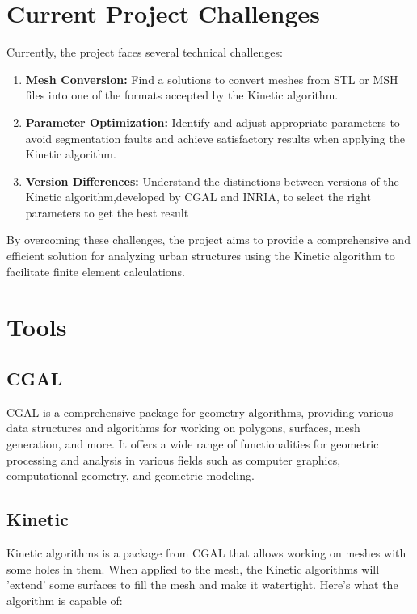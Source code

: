 \documentclass{article}
\begin{document}
\section{Current Project Challenges}

Currently, the project faces several technical challenges:

\begin{enumerate}
    \item \textbf{Mesh Conversion:} Find a solutions to convert meshes 
    from STL or MSH files into one of the formats accepted by the Kinetic algorithm.
    
    \item \textbf{Parameter Optimization:} Identify and adjust appropriate 
    parameters to avoid segmentation faults and achieve satisfactory results 
    when applying the Kinetic algorithm.
    
    \item \textbf{Version Differences:} Understand the distinctions between 
    versions of the Kinetic algorithm,developed by CGAL and INRIA, to select 
    the right parameters to get the best result
\end{enumerate}

By overcoming these challenges, the project aims to provide a 
comprehensive and efficient solution for analyzing urban structures 
using the Kinetic algorithm to facilitate finite element calculations.\newline

\section{Tools}
\subsection{CGAL}
CGAL is a comprehensive package for geometry algorithms, providing various data structures and algorithms for working on polygons, surfaces, mesh generation, and more.
It offers a wide range of functionalities for geometric processing and analysis in various fields such as computer graphics, computational geometry, and geometric modeling.
\subsection{Kinetic}

Kinetic algorithms is a package from CGAL that allows working on meshes with some holes in them. When applied to the mesh, the Kinetic algorithms will 'extend' some surfaces to fill the mesh and make it watertight. 
Here's what the algorithm is capable of:
\end{document}
